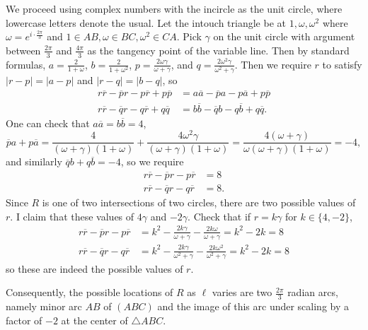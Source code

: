 We proceed using complex numbers with the incircle as the unit circle, where lowercase letters denote the usual. Let the intouch triangle be at $1,\omega,\omega^2$ where $\omega=e^{i\cdot\frac{2\pi}{3}}$ and $1\in AB,\omega\in BC,\omega^2\in CA$. Pick $\gamma$ on the unit circle with argument between $\frac{2\pi}{3}$ and $\frac{4\pi}{3}$ as the tangency point of the variable line. Then by standard formulas, $a=\frac{2}{1+\omega}$, $b=\frac{2}{1+\omega^2}$, $p=\frac{2\omega\gamma}{\omega+\gamma}$, and $q=\frac{2\omega^2\gamma}{\omega^2+\gamma}$. Then we require $r$ to satisfy $|r-p|=|a-p|$ and $|r-q|=|b-q|$, so
\begin{align*}
	r\overline{r}-\overline{p}r-p\overline{r}+p\overline{p} &= a\overline{a}-\overline{p}a-p\overline{a}+p\overline{p} \\
	r\overline{r}-\overline{q}r-q\overline{r}+q\overline{q} &= b\overline{b}-\overline{q}b-q\overline{b}+q\overline{q}.
\end{align*}
One can check that $a\overline{a}=b\overline{b}=4$,
\[
	\overline{p}a+p\overline{a}=\frac{4}{(\omega+\gamma)(1+\omega)}+\frac{4\omega^2\gamma}{(\omega+\gamma)(1+\omega)}=\frac{4(\omega+\gamma)}{\omega(\omega+\gamma)(1+\omega)}=-4,
\]
and similarly $\overline{q}b+q\overline{b}=-4$, so we require
\begin{align*}
	r\overline{r}-\overline{p}r-p\overline{r} &= 8 \\
	r\overline{r}-\overline{q}r-q\overline{r} &= 8.
\end{align*}
Since $R$ is one of two intersections of two circles, there are two possible values of $r$. I claim that these values of $4\gamma$ and $-2\gamma$. Check that if $r=k\gamma$ for $k\in\{4,-2\}$,
\begin{align*}
	r\overline{r}-\overline{p}r-p\overline{r} &= k^2-\frac{2k\gamma}{\omega+\gamma}-\frac{2k\omega}{\omega+\gamma} = k^2-2k = 8 \\
	r\overline{r}-\overline{q}r-q\overline{r} &= k^2-\frac{2k\gamma}{\omega^2+\gamma}-\frac{2k\omega^2}{\omega^2+\gamma} = k^2-2k = 8
\end{align*}
so these are indeed the possible values of $r$.

Consequently, the possible locations of $R$ as $\ell$ varies are two $\frac{2\pi}{3}$ radian arcs, namely minor arc $AB$ of $(ABC)$ and the image of this arc under scaling by a factor of $-2$ at the center of $\triangle{ABC}$.
